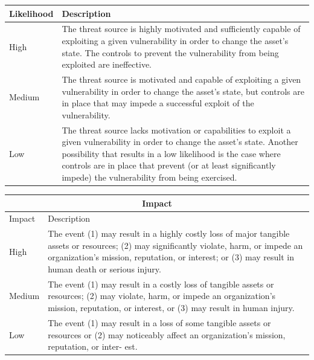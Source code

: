 \documentclass[english]{article}
\begin{document}

\begin{center}
\begin{tabular}{|l|p{}|}
\hline
Likelihood & Description \\
\hline
\hline
High   & The threat source is highly motivated and sufficiently capable of exploiting a given vulnerability in order to change the asset's state. The controls to prevent the vulnerability from being exploited are ineffective. \\
\hline
Medium & The threat source is motivated and capable of exploiting a given vulnerability in order to change the asset's state, but controls are in place that may impede a successful exploit of the vulnerability. \\
\hline
Low   & The threat source lacks motivation or capabilities to exploit a given vulnerability in order to change the asset's state. Another possibility that results in a low likelihood is the case where controls are in place that prevent (or at least significantly impede) the vulnerability from being exercised. \\
\hline
\end{tabular}
\hspace{3em}
\begin{tabular}{|l|p{}|}
\hline
\multicolumn{2}{|c|}{\bf Impact} \\
\hline
Impact & Description \\
\hline
\hline
High   & The event (1) may result in a highly costly loss of major tangible assets or resources; (2) may significantly violate, harm, or impede an organization's mission, reputation, or interest; or (3) may result in human death or serious injury. \\
\hline
Medium & The event (1) may result in a costly loss of tangible assets or resources; (2) may violate, harm, or impede an organization's mission, reputation, or interest, or (3) may result in human injury. \\
\hline
Low   & The event (1) may result in a loss of some tangible assets or resources or (2) may noticeably affect an organization's mission, reputation, or inter- est. \\
\hline
\end{tabular}
\end{center}
\end{document}
